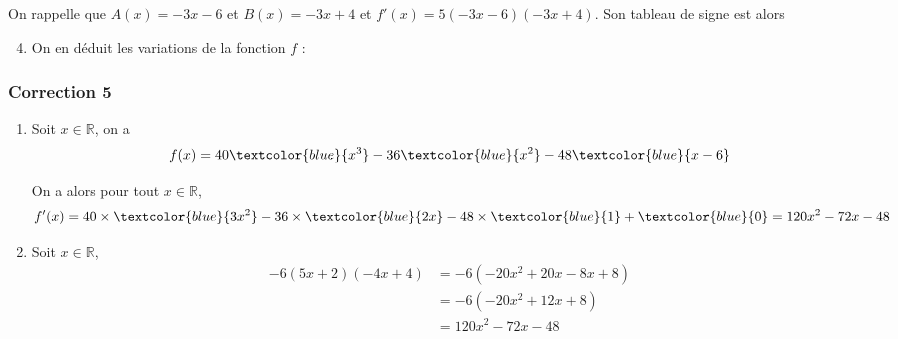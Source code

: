 \documentclass[15pt, mathserif]{beamer}
\newcommand{\R}{\mathbb{R}}			%
\begin{document}
\begin{frame}On rappelle que $A(x) = -3x-6$ et $B(x) = -3x+4$ et $f'(x) = 5(-3x-6)(-3x+4)$. Son tableau de signe est alors 

\medskip \hfil
{}

 \begin{enumerate} 
 \setcounter{enumi}{3} 
 	 \item On en déduit les variations de la fonction $f$ : 

  \medskip \hfil
{}

 \end{enumerate} 
 
\end{frame}


\begin{frame}
\vspace{-10mm}
	\frametitle{Correction 5}
\begin{enumerate} 
 	 \item Soit $x \in \R$, on a $$f(x)=40\textcolor{blue}{x^3}-36\textcolor{blue}{x^2}-48\textcolor{blue}{x-6}$$
 
 On a alors pour tout $x \in  \R$, $$f'(x)= 40\times \textcolor{blue}{3x^2} -36\times \textcolor{blue}{2x}-48\times \textcolor{blue}{1}+\textcolor{blue}{0}=120x^2-72x-48$$
 	 \item Soit $x \in \R$, \begin{align*} 
 -6(5x+2)(-4x+4) & = -6\left( -20x^2 +20x -8x +8\right) \\ 
 &=  -6\left( -20x^2 +12x +8\right) \\ 
 &= 120x^2 -72x -48
 \end{align*} \end{enumerate} 
 
 \end{frame} 
 
\end{document}
